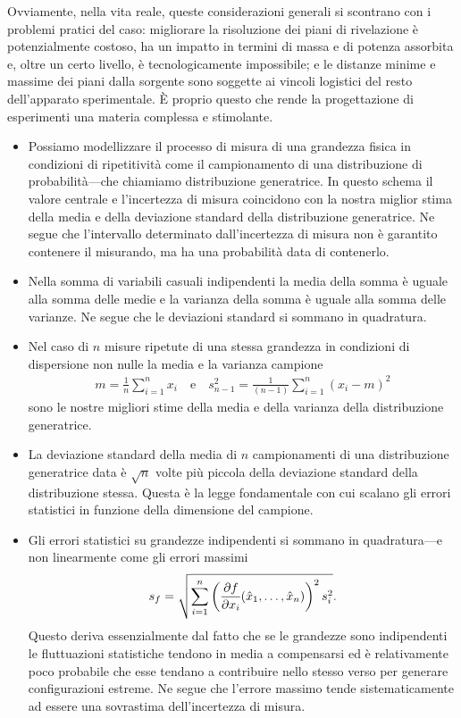 Ovviamente, nella vita reale, queste considerazioni generali si scontrano
con i problemi pratici del caso: migliorare la risoluzione dei piani di rivelazione
è potenzialmente costoso, ha un impatto in termini di massa e di potenza assorbita e,
oltre un certo livello, è tecnologicamente impossibile; e le distanze minime e
massime dei piani dalla sorgente sono soggette ai vincoli logistici del resto
dell'apparato sperimentale. \`E proprio questo che rende la progettazione di
esperimenti una materia complessa e stimolante.


\summary

\begin{itemize}
\item Possiamo modellizzare il processo di misura di una grandezza fisica in
  condizioni di ripetitività come il campionamento di una distribuzione
  di probabilità---che chiamiamo distribuzione generatrice. In questo schema
  il valore centrale e l'incertezza di misura coincidono con la nostra miglior
  stima della media e della deviazione standard della distribuzione generatrice.
  Ne segue che l'intervallo determinato dall'incertezza di misura non è
  garantito contenere il misurando, ma ha una probabilità data di contenerlo.
\item Nella somma di variabili casuali indipendenti la media della somma è
  uguale alla somma delle medie e la varianza della somma è uguale alla somma
  delle varianze. Ne segue che le deviazioni standard si sommano in
  quadratura.
\item Nel caso di $n$ misure ripetute di una stessa grandezza in condizioni di
  dispersione non nulle la media e la varianza campione
  \begin{align*}
    m = \frac{1}{n}\sum_{i = 1}^n x_i
    \quad\text{e}\quad
    s^2_{n - 1} = \frac{1}{(n - 1)}\sum_{i = 1}^n (x_i - m)^2
  \end{align*}
  sono le nostre migliori stime della media e della varianza della distribuzione
  generatrice.
\item La deviazione standard della media di $n$ campionamenti di una
  distribuzione generatrice data è $\sqrt{n}$ volte più piccola della
  deviazione standard della distribuzione stessa. Questa è la legge
  fondamentale con cui scalano gli errori statistici in funzione della
  dimensione del campione.
\item Gli errori statistici su grandezze indipendenti si sommano in
  quadratura---e non linearmente come gli errori massimi
  \begin{align*}
    s_f = \sqrt{\sum_{i = 1}^n
      \left(\pd{f}{x_i}{\hat{x}_1,\ldots,\hat{x}_n}\right)^2 s^2_i
    }.
  \end{align*}
  Questo deriva essenzialmente dal fatto che se le grandezze sono indipendenti
  le fluttuazioni statistiche tendono in media a compensarsi ed è
  relativamente poco probabile che esse tendano a contribuire nello stesso
  verso per generare configurazioni estreme. Ne segue che l'errore massimo
  tende sistematicamente ad essere una sovrastima dell'incertezza di misura.
\end{itemize}
